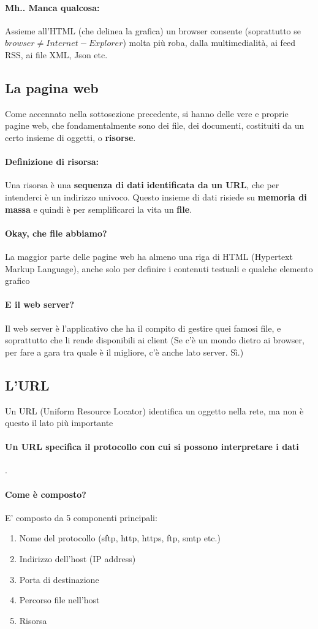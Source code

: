 \documentclass[12pt, a4paper, openany, twoside]{book}
\begin{document}
\paragraph{Mh.. Manca qualcosa:} Assieme all'HTML (che delinea la grafica) un
browser consente (soprattutto se $browser \neq Internet-Explorer$) molta più
roba, dalla multimedialità, ai feed RSS, ai file XML, Json etc. 
\subsection{La pagina web}
Come accennato nella sottosezione precedente, si hanno delle vere e proprie 
pagine web, che fondamentalmente sono dei file, dei documenti, costituiti da
un certo insieme di oggetti, o \textbf{risorse}.
\paragraph{Definizione di risorsa:} Una risorsa è una \textbf{sequenza di dati}
\textbf{identificata da un URL}, che per intenderci è un indirizzo univoco. 
Questo insieme di dati risiede su \textbf{memoria di massa} e quindi è per 
semplificarci la vita un \textbf{file}. 
\paragraph{Okay, che file abbiamo?} La maggior parte delle pagine web ha almeno
una riga di HTML (Hypertext Markup Language), anche solo per definire i contenuti
testuali e qualche elemento grafico
\paragraph{E il web server?} Il web server è l'applicativo che ha il compito di
gestire quei famosi file, e soprattutto che li rende disponibili ai client (Se
c'è un mondo dietro ai browser, per fare a gara tra quale è il migliore, c'è 
anche lato server. Sì.)
\subsection{L'URL}
Un URL (Uniform Resource Locator) identifica un oggetto nella rete, ma non è questo
il lato più importante
\paragraph{Un URL specifica il protocollo con cui si possono interpretare i dati}.
\paragraph{Come è composto?} E' composto da 5 componenti principali:
\begin{enumerate}
	\item Nome del protocollo (sftp, http, https, ftp, smtp etc.)
	\item Indirizzo dell'host (IP address)
	\item Porta di destinazione 
	\item Percorso file nell'host
	\item Risorsa
\end{enumerate}
\end{document}
